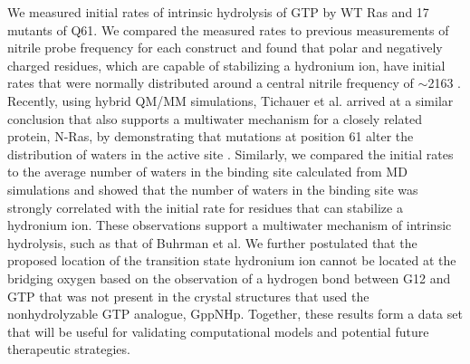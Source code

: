 We measured initial rates of intrinsic hydrolysis of GTP by WT Ras and 17 mutants of Q61. 
We compared the measured rates to previous measurements of nitrile probe frequency for each construct and found that polar and negatively charged residues, which are capable of stabilizing a hydronium ion, have initial rates that were normally distributed around a central nitrile frequency of $\sim$2163 \si{\wn}. 
Recently, using hybrid QM/MM simulations, Tichauer et al. arrived at a similar conclusion that also supports a multiwater mechanism for a closely related protein, N-Ras, by demonstrating that mutations at position 61 alter the distribution of waters in the active site \cite{Tichauer2018}. 
Similarly, we compared the initial rates to the average number of waters in the binding site calculated from MD simulations and showed that the number of waters in the binding site was strongly correlated with the initial rate for residues that can stabilize a hydronium ion. 
These observations support a multiwater mechanism of intrinsic hydrolysis, such as that of Buhrman et al. 
We further postulated that the proposed location of the transition state hydronium ion cannot be located at the bridging oxygen based on the observation of a hydrogen bond between G12 and GTP that was not present in the crystal structures that used the nonhydrolyzable GTP analogue, GppNHp. 
Together, these results form a data set that will be useful for validating computational models and potential future therapeutic strategies.

